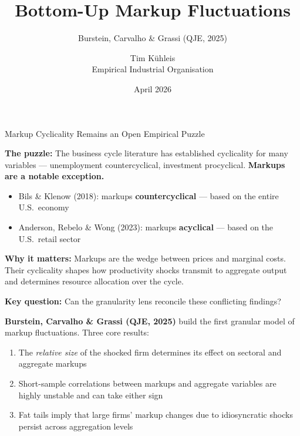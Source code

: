 \documentclass[10pt,aspectratio=169]{beamer}
\title[BCG (2025)]{\textbf{Bottom-Up Markup Fluctuations}}
\subtitle{Burstein, Carvalho \& Grassi (QJE, 2025)}
\author{Tim K\"{u}hleis \\[0.5em]\small Empirical Industrial Organisation}
\date{April 2026}
\begin{document}
\begin{frame}
  \titlepage
\end{frame}

\begin{frame}{Markup Cyclicality Remains an Open Empirical Puzzle}

\textbf{The puzzle:} The business cycle literature has established cyclicality for many variables --- unemployment countercyclical, investment procyclical. \textbf{Markups are a notable exception.}

\vspace{0.4em}
\begin{itemize}
  \item Bils \& Klenow (2018): markups \textbf{countercyclical} --- based on the entire U.S.\ economy
  \item Anderson, Rebelo \& Wong (2023): markups \textbf{acyclical} --- based on the U.S.\ retail sector
\end{itemize}

\vspace{0.4em}
\textbf{Why it matters:} Markups are the wedge between prices and marginal costs. Their cyclicality shapes how productivity shocks transmit to aggregate output and determines resource allocation over the cycle.

\vspace{0.4em}
\textbf{Key question:} Can the granularity lens reconcile these conflicting findings?

\vspace{0.4em}
\textbf{Burstein, Carvalho \& Grassi (QJE, 2025)} build the first granular model of markup fluctuations. Three core results:

\vspace{0.2em}
\begin{enumerate}
  \item The \textit{relative size} of the shocked firm determines its effect on sectoral and aggregate markups
  \item Short-sample correlations between markups and aggregate variables are highly unstable and can take either sign
  \item Fat tails imply that large firms' markup changes due to idiosyncratic shocks persist across aggregation levels
\end{enumerate}

\end{frame}
\end{document}
